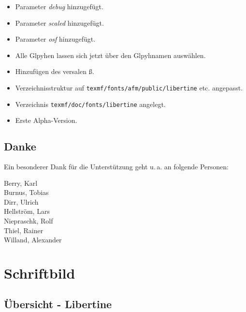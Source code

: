\documentclass{fontdokuold}
\begin{document}
\begin{description}
\begin{itemize}
\item Parameter \emph{debug} hinzugefügt.
\item Parameter \emph{scaled} hinzugefügt.
\item Parameter \emph{osf} hinzugefügt.
\item Alle Glpyhen lassen sich jetzt über den Glpyhnamen auswählen.
\item Hinzufügen des versalen ß.
\item Verzeichnisstruktur auf \texttt{texmf/fonts/afm/public/libertine} etc. angepasst.
\item Verzeichnis \texttt{texmf/doc/fonts/libertine} angelegt.
\end{itemize}
\item[1. Mai 2007]
\begin{itemize}
\item Erste Alpha-Version.
\end{itemize}
\end{description}

\section{Danke}

Ein besonderer Dank für die Unterstützung geht u.\,a. an folgende Personen:

\begin{multicols}{2}
Berry, Karl\\
Burnus, Tobias\\
Dirr, Ulrich\\
Hellström, Lars\\
Niepraschk, Rolf\\
Thiel, Rainer\\
Willand, Alexander\\
\end{multicols}












\chapter{Schriftbild}

\section{Übersicht - Libertine}
\end{document}
